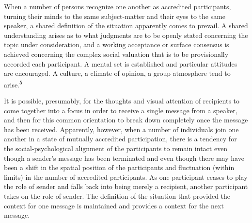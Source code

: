 \documentclass[twoside,symmetric,nobib,justified]{tufte-book}
\begin{document}
When a number of persons recognize one another as accredited
participants, turning their minds to the same subject-matter and their
eyes to the same speaker, a shared definition of the situation
apparently comes to prevail. A shared understanding arises as to what
judgments are to be openly stated concerning the topic under
consideration, and a working acceptance or surface consensus is achieved
concerning the complex social valuation that is to be provisionally
accorded each participant. A mental set is established and particular
attitudes are encouraged. A culture, a climate of opinion, a group
atmosphere tend to arise.\textsuperscript{5}

It is possible, presumably, for the thoughts and visual attention of
recipients to come together into a focus in order to receive a single
message from a speaker, and then for this common orientation to break
down completely once the message has been received. Apparently, however,
when a number of individuals join one another in a state of mutually
accredited participation, there is a tendency for the
social-psychological alignment of the participants to remain intact even
though a sender's message has been terminated and even though there may
have been a shift in the spatial position of the participants and
fluctuation (within limits) in the number of accredited participants. As
one participant ceases to play the role of sender and falls back into
being merely a recipient, another participant takes on the role of
sender. The definition of the situation that provided the context for
one message is maintained and provides a context for the next message.
\end{document}
